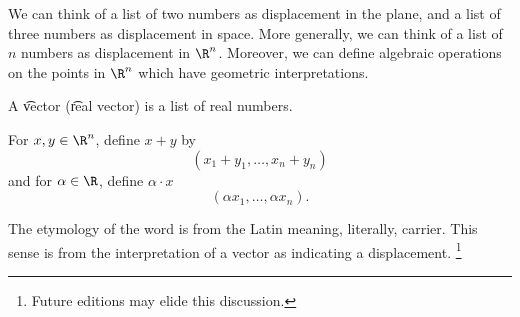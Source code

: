 
We can think of a list of two numbers as displacement in the plane, and a list of three numbers as displacement in space.
More generally, we can think of a list of $n$ numbers as displacement in $\R^n$.
Moreover, we can define algebraic operations on the points in $\R^n$ which have geometric interpretations.

A \t{vector} (\t{real vector}) is a list of real numbers.

For $x, y \in \R^n$, define $x + y$ by
  \[
(x_1 +y_1, \dots, x_n + y_n)
  \]
and for $\alpha \in \R$, define $\alpha \cdot x$
  \[
(\alpha x_1, \dots, \alpha x_n).
  \]

The etymology of the word  is from the Latin  meaning, literally, carrier.
This sense is from the interpretation of a vector as indicating a displacement.
  \ifhmode\unskip\fi\footnote{
Future editions may elide this discussion.
  }

\blankpage
